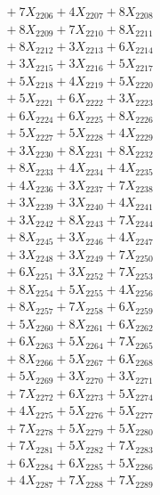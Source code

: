 \documentclass[a4paper,10pt]{article}
\begin{document}
{\begin{align}
&\;  + 7 X_{2206} + 4 X_{2207} + 8 X_{2208} \\[0.3ex]
&\;  + 8 X_{2209} + 7 X_{2210} + 8 X_{2211} \\[0.3ex]
&\;  + 8 X_{2212} + 3 X_{2213} + 6 X_{2214} \\[0.3ex]
&\;  + 3 X_{2215} + 3 X_{2216} + 5 X_{2217} \\[0.3ex]
&\;  + 5 X_{2218} + 4 X_{2219} + 5 X_{2220} \\[0.3ex]
&\;  + 5 X_{2221} + 6 X_{2222} + 3 X_{2223} \\[0.3ex]
&\;  + 6 X_{2224} + 6 X_{2225} + 8 X_{2226} \\[0.3ex]
&\;  + 5 X_{2227} + 5 X_{2228} + 4 X_{2229} \\[0.5ex]\allowbreak
&\;  + 3 X_{2230} + 8 X_{2231} + 8 X_{2232} \\[0.3ex]
&\;  + 8 X_{2233} + 4 X_{2234} + 4 X_{2235} \\[0.3ex]
&\;  + 4 X_{2236} + 3 X_{2237} + 7 X_{2238} \\[0.3ex]
&\;  + 3 X_{2239} + 3 X_{2240} + 4 X_{2241} \\[0.3ex]
&\;  + 3 X_{2242} + 8 X_{2243} + 7 X_{2244} \\[0.3ex]
&\;  + 8 X_{2245} + 3 X_{2246} + 4 X_{2247} \\[0.3ex]
&\;  + 3 X_{2248} + 3 X_{2249} + 7 X_{2250} \\[0.3ex]
&\;  + 6 X_{2251} + 3 X_{2252} + 7 X_{2253} \\[0.3ex]
&\;  + 8 X_{2254} + 5 X_{2255} + 4 X_{2256} \\[0.3ex]
&\;  + 8 X_{2257} + 7 X_{2258} + 6 X_{2259} \\[0.5ex]\allowbreak
&\;  + 5 X_{2260} + 8 X_{2261} + 6 X_{2262} \\[0.3ex]
&\;  + 6 X_{2263} + 5 X_{2264} + 7 X_{2265} \\[0.3ex]
&\;  + 8 X_{2266} + 5 X_{2267} + 6 X_{2268} \\[0.3ex]
&\;  + 5 X_{2269} + 3 X_{2270} + 3 X_{2271} \\[0.3ex]
&\;  + 7 X_{2272} + 6 X_{2273} + 5 X_{2274} \\[0.3ex]
&\;  + 4 X_{2275} + 5 X_{2276} + 5 X_{2277} \\[0.3ex]
&\;  + 7 X_{2278} + 5 X_{2279} + 5 X_{2280} \\[0.3ex]
&\;  + 7 X_{2281} + 5 X_{2282} + 7 X_{2283} \\[0.3ex]
&\;  + 6 X_{2284} + 6 X_{2285} + 5 X_{2286} \\[0.3ex]
&\;  + 4 X_{2287} + 7 X_{2288} + 7 X_{2289} \\[0.5ex]\allowbreak

\end{align}}
\end{document}
